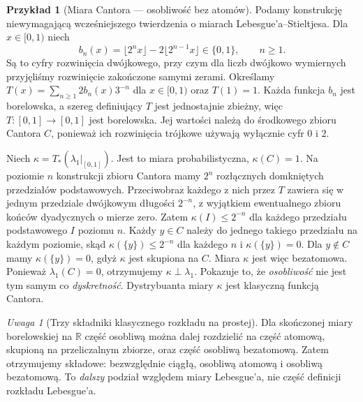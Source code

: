 \documentclass[11pt,a4paper,oneside]{book}
\numberwithin{equation}{chapter}
\theoremstyle{plain}
\theoremstyle{definition}
\newtheorem{przyklad}[twierdzenie]{Przykład}
\theoremstyle{remark}
\newtheorem{uwaga}[twierdzenie]{Uwaga}
\begin{document}
\begin{przyklad}[Miara Cantora — osobliwość bez atomów]
\label{ex:cantor-measure-17}
Podamy konstrukcję niewymagającą wcześniejszego twierdzenia
o miarach Lebesgue'a--Stieltjesa. Dla $x\in[0,1)$ niech
\[
b_n(x)=\lfloor2^nx\rfloor-2\lfloor2^{n-1}x\rfloor\in\{0,1\},
\qquad n\ge1.
\]
Są to cyfry rozwinięcia dwójkowego, przy czym dla liczb
dwójkowo wymiernych przyjęliśmy rozwinięcie zakończone
samymi zerami. Określamy
$T(x)=\sum_{n\ge1}2b_n(x)3^{-n}$ dla $x\in[0,1)$
oraz $T(1)=1$. Każda funkcja $b_n$ jest borelowska,
a szereg definiujący $T$ jest jednostajnie zbieżny,
więc $T:[0,1]\to[0,1]$ jest borelowska. Jej wartości
należą do środkowego zbioru Cantora $C$, ponieważ ich
rozwinięcia trójkowe używają wyłącznie cyfr $0$ i $2$.

Niech $\kappa=T_*(\lambda_1|_{[0,1]})$. Jest to miara
probabilistyczna, $\kappa(C)=1$. Na poziomie $n$
konstrukcji zbioru Cantora mamy $2^n$ rozłącznych
domkniętych przedziałów podstawowych. Przeciwobraz
każdego z nich przez $T$ zawiera się w jednym przedziale
dwójkowym długości $2^{-n}$, z wyjątkiem ewentualnego
zbioru końców dyadycznych o mierze zero. Zatem
$\kappa(I)\le2^{-n}$ dla każdego przedziału podstawowego
$I$ poziomu $n$. Każdy $y\in C$ należy do jednego
takiego przedziału na każdym poziomie, skąd
$\kappa(\{y\})\le2^{-n}$ dla każdego $n$ i
$\kappa(\{y\})=0$. Dla $y\notin C$ mamy
$\kappa(\{y\})=0$, gdyż $\kappa$ jest skupiona na $C$.
Miara $\kappa$ jest więc bezatomowa. Ponieważ
$\lambda_1(C)=0$, otrzymujemy $\kappa\perp\lambda_1$.
Pokazuje to, że \emph{osobliwość} nie jest tym samym co
\emph{dyskretność}. Dystrybuanta miary $\kappa$ jest
klasyczną funkcją Cantora.
\end{przyklad}

\begin{uwaga}[Trzy składniki klasycznego rozkładu na prostej]
Dla skończonej miary borelowskiej na $\mathbb R$ część
osobliwą można dalej rozdzielić na część atomową,
skupioną na przeliczalnym zbiorze, oraz część osobliwą
bezatomową. Zatem otrzymujemy składowe: bezwzględnie
ciągłą, osobliwą atomową i osobliwą bezatomową.
To \emph{dalszy} podział względem miary Lebesgue'a,
nie część definicji rozkładu Lebesgue'a.
\end{uwaga}
\end{document}
